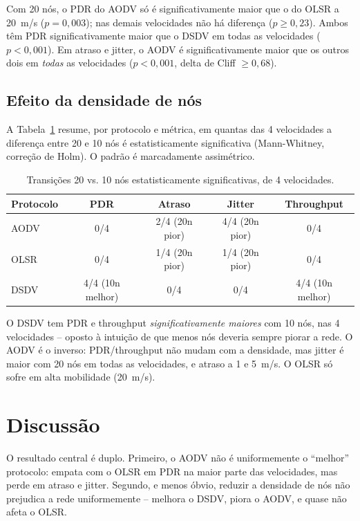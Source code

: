 \documentclass[12pt]{article}
\begin{document}
Com 20 nós, o PDR do AODV só é significativamente maior que o do OLSR a 20~m/s ($p=0{,}003$); nas demais velocidades não há diferença ($p \geq 0{,}23$). Ambos têm PDR significativamente maior que o DSDV em todas as velocidades ($p<0{,}001$). Em atraso e jitter, o AODV é significativamente maior que os outros dois em \emph{todas} as velocidades ($p<0{,}001$, delta de Cliff $\geq 0{,}68$).

\subsection{Efeito da densidade de nós}
\label{sec:densidade}

A Tabela~\ref{tab:density} resume, por protocolo e métrica, em quantas das 4 velocidades a diferença entre 20 e 10 nós é estatisticamente significativa (Mann-Whitney, correção de Holm). O padrão é marcadamente assimétrico.

\begin{table}[H]
\centering
\caption{Transições 20 vs. 10 nós estatisticamente significativas, de 4 velocidades.}
\label{tab:density}
\footnotesize
\begin{tabular}{lcccc}
\hline
\textbf{Protocolo} & \textbf{PDR} & \textbf{Atraso} & \textbf{Jitter} & \textbf{Throughput} \\
\hline
AODV & 0/4 & 2/4 (20n pior) & 4/4 (20n pior) & 0/4 \\
OLSR & 0/4 & 1/4 (20n pior) & 1/4 (20n pior) & 0/4 \\
DSDV & 4/4 (10n melhor) & 0/4 & 0/4 & 4/4 (10n melhor) \\
\hline
\end{tabular}
\end{table}

O DSDV tem PDR e throughput \emph{significativamente maiores} com 10 nós, nas 4 velocidades -- oposto à intuição de que menos nós deveria sempre piorar a rede. O AODV é o inverso: PDR/throughput não mudam com a densidade, mas jitter é maior com 20 nós em todas as velocidades, e atraso a 1 e 5~m/s. O OLSR só sofre em alta mobilidade (20~m/s).

\section{Discussão}
\label{sec:discussao}

O resultado central é duplo. Primeiro, o AODV não é uniformemente o ``melhor'' protocolo: empata com o OLSR em PDR na maior parte das velocidades, mas perde em atraso e jitter. Segundo, e menos óbvio, reduzir a densidade de nós não prejudica a rede uniformemente -- melhora o DSDV, piora o AODV, e quase não afeta o OLSR.
\end{document}
